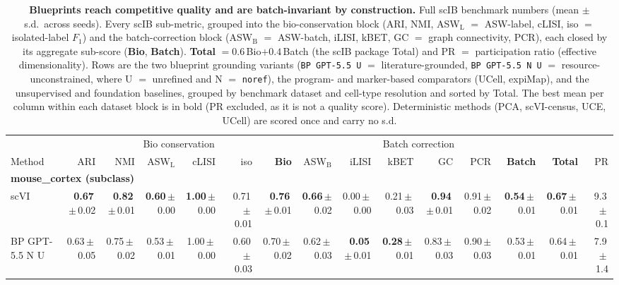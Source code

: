 \begin{table}
\centering
\scriptsize
\setlength{\tabcolsep}{3.2pt}
\caption{\textbf{Blueprints reach competitive quality and are batch-invariant by construction.} Full scIB benchmark numbers (mean $\pm$ s.d.\ across seeds). Every scIB sub-metric, grouped into the bio-conservation block (ARI, NMI, ASW$_\mathrm{L}$ $=$ ASW-label, cLISI, iso $=$ isolated-label $F_1$) and the batch-correction block (ASW$_\mathrm{B}$ $=$ ASW-batch, iLISI, kBET, GC $=$ graph connectivity, PCR), each closed by its aggregate sub-score (\textbf{Bio}, \textbf{Batch}). \textbf{Total} $=0.6\,$Bio$+0.4\,$Batch (the scIB package Total) and PR $=$ participation ratio (effective dimensionality). Rows are the two blueprint grounding variants (\texttt{BP GPT-5.5 U} $=$ literature-grounded, \texttt{BP GPT-5.5 N U} $=$ resource-unconstrained, where U $=$ unrefined and N $=$ \texttt{noref}), the program- and marker-based comparators (UCell, expiMap), and the unsupervised and foundation baselines, grouped by benchmark dataset and cell-type resolution and sorted by Total. The best mean per column within each dataset block is in bold (PR excluded, as it is not a quality score). Deterministic methods (PCA, scVI-census, UCE, UCell) are scored once and carry no s.d.}
\label{supptab:r2numbers}
\begin{tabular}{lrrrrrrrrrrrrrr}
\toprule
 & \multicolumn{6}{c}{Bio conservation} & \multicolumn{6}{c}{Batch correction} & & \\
\cmidrule(lr){2-7}\cmidrule(lr){8-13}
Method & ARI & NMI & ASW$_\mathrm{L}$ & cLISI & iso & \textbf{Bio} & ASW$_\mathrm{B}$ & iLISI & kBET & GC & PCR & \textbf{Batch} & \textbf{Total} & PR \\
\midrule
\multicolumn{15}{l}{\textbf{mouse\_cortex (subclass)}}\\[1pt]
scVI & \textbf{0.67}\,$\pm$\,0.02 & \textbf{0.82}\,$\pm$\,0.01 & \textbf{0.60}\,$\pm$\,0.00 & \textbf{1.00}\,$\pm$\,0.00 & 0.71\,$\pm$\,0.01 & \textbf{0.76}\,$\pm$\,0.01 & \textbf{0.66}\,$\pm$\,0.02 & 0.00\,$\pm$\,0.00 & 0.21\,$\pm$\,0.03 & \textbf{0.94}\,$\pm$\,0.01 & 0.91\,$\pm$\,0.02 & \textbf{0.54}\,$\pm$\,0.01 & \textbf{0.67}\,$\pm$\,0.01 & 9.3\,$\pm$\,0.1 \\
BP GPT-5.5 N U & 0.63\,$\pm$\,0.05 & 0.75\,$\pm$\,0.02 & 0.53\,$\pm$\,0.01 & 1.00\,$\pm$\,0.00 & 0.60\,$\pm$\,0.03 & 0.70\,$\pm$\,0.02 & 0.62\,$\pm$\,0.03 & \textbf{0.05}\,$\pm$\,0.01 & \textbf{0.28}\,$\pm$\,0.01 & 0.83\,$\pm$\,0.03 & 0.90\,$\pm$\,0.03 & 0.53\,$\pm$\,0.01 & 0.64\,$\pm$\,0.01 & 7.9\,$\pm$\,1.4 \\

\end{tabular}
\end{table}
